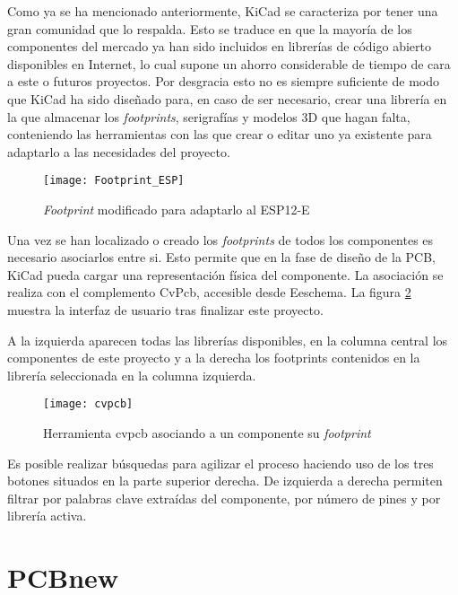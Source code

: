 Como ya se ha mencionado anteriormente, KiCad se caracteriza por tener una gran comunidad que lo respalda. Esto se traduce en que la mayoría de los componentes del mercado ya han sido incluidos en librerías de código abierto disponibles en Internet, lo cual supone un ahorro considerable de tiempo de cara a este o futuros proyectos. 
Por desgracia esto no es siempre suficiente de modo que KiCad ha sido diseñado para, en caso de ser necesario, crear una librería en la que almacenar los \textit{footprints}, serigrafías y modelos 3D que hagan falta, conteniendo las herramientas con las que crear o editar uno ya existente para adaptarlo a las necesidades del proyecto.

\begin{figure} [h]
    \centering
    \texttt{[image: Footprint\_ESP]}
    \caption{\textit{Footprint }modificado para adaptarlo al ESP12-E}
    \label{fig:Footprint_ESP}
\end{figure}

Una vez se han localizado o creado los \textit{footprints} de todos los componentes es necesario asociarlos entre si. Esto permite que en la fase de diseño de la PCB, KiCad pueda cargar una representación física del componente. 
La asociación se realiza con el complemento CvPcb, accesible desde Eeschema. La figura \ref{fig:cvpcb} muestra la interfaz de usuario tras finalizar este proyecto.

\clearpage

A la izquierda aparecen todas las librerías disponibles, en la columna central los componentes de este proyecto y a la derecha los footprints contenidos en la librería seleccionada en la columna izquierda.

\begin{figure} [h]
    \centering
    \texttt{[image: cvpcb]}
    \caption{Herramienta cvpcb asociando a un componente su \textit{footprint}}
    \label{fig:cvpcb}
\end{figure}

Es posible realizar búsquedas para agilizar el proceso haciendo uso de los tres botones situados en la parte superior derecha. De izquierda a derecha permiten filtrar por palabras clave extraídas del componente, por número de pines y por librería activa.

\clearpage

\section{PCBnew\label{sec:PCBnew}}

